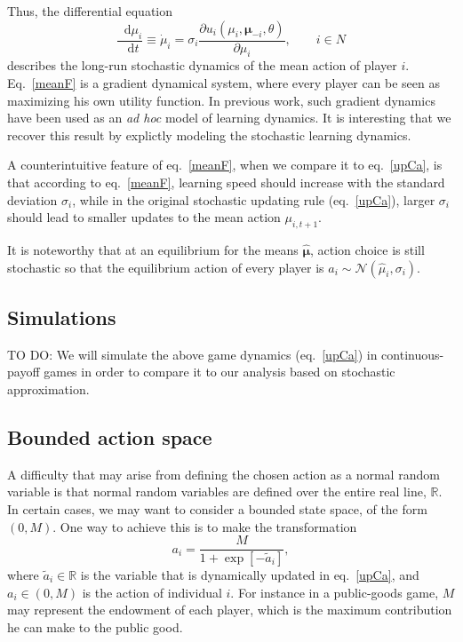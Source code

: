 \documentclass[11pt,reqno]{amsart}
\newcommand{\e}{\theta}
\newcommand{\ac}{a}
\newcommand{\de}{\mathop{}\!\mathrm{d}}
\newcommand{\Rn}{\mathds{R}}
\newcommand{\np}{N}%
\newcommand{\tm}{t}%
\newcommand{\pf}{u}
\newcommand{\ma}{\mu}
\newcommand{\sd}{\sigma}
\newcommand{\Nd}{\mathcal{N}}
\newcommand{\vma}{\boldsymbol{\ma}}
\newcommand{\pd}{\partial}
\newcommand{\mx}{M}
\begin{document}
Thus, the differential equation
\begin{equation}
\label{meanF}
\frac{\de \ma_i}{\de \tm} \equiv \dot{\ma}_i = \sd_{i}  \frac{\pd \pf_{i}(\ma_{i},\vma_{-i},\e)}{\pd \ma_{i}}, \qquad i\in\np
\end{equation}
describes the long-run stochastic dynamics of the mean action of player $i$. Eq.~\ref{meanF} is a gradient dynamical system, where every player can be seen as maximizing his own utility function. In previous work, such gradient dynamics have been used as an \emph{ad hoc} model of learning dynamics. It is interesting that we recover this result by explictly modeling the stochastic learning dynamics.

A counterintuitive feature of eq.~\ref{meanF}, when we compare it to eq.~\ref{upCa}, is that according to eq.~\ref{meanF}, learning speed should increase with the standard deviation $\sd_{i}$, while in the original stochastic updating rule (eq.~\ref{upCa}), larger $\sd_{i}$ should lead to smaller updates to the mean action $\ma_{i,\tm+1}$.

It is noteworthy that at an equilibrium for the means $\hat{\vma}$, action choice is still stochastic so that the equilibrium action of every player is $\hat{\ac}_i \sim \Nd(\hat{\ma}_{i},\sd_{i})$.


\subsection{Simulations}

TO DO: We will simulate the above game dynamics (eq.~\ref{upCa}) in continuous-payoff games in order to compare it to our analysis based on stochastic approximation.

\subsection{Bounded action space}

A difficulty that may arise from defining the chosen action as a normal random variable is that normal random variables are defined over the entire real line, $\Rn$. In certain cases, we may want to consider a bounded state space, of the form $(0,\mx)$. One way to achieve this is to make the transformation
\begin{equation}
\label{logitTr}
\ac_i = \frac{\mx}{1+ \exp[-\tilde{\ac}_i]},
\end{equation}
where $\tilde{\ac}_i \in \Rn$ is the variable that is dynamically updated in eq.~\ref{upCa}, and $\ac_i \in (0,\mx)$ is the action of individual $i$. For instance in a public-goods game, $\mx$ may represent the endowment of each player, which is the maximum contribution he can make to the public good.
\end{document}

